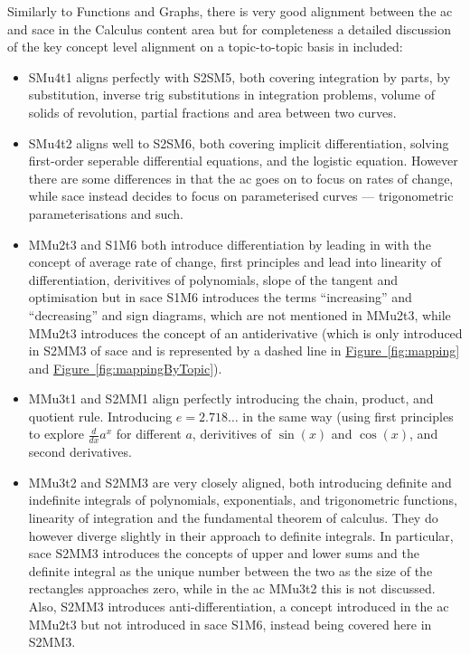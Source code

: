 \documentclass[twoside,12pt,a4paper]{report}
\newcommand{\reffig}[1]{\hyperref[fig:#1]{Figure~\ref{fig:#1}}}
\begin{document}
Similarly to Functions and Graphs, there is very good alignment between the \gls{ac} and \gls{sace} in the Calculus content area but for completeness a detailed discussion of the key concept level alignment on a topic-to-topic basis in included:

\begin{itemize}
	\item SMu4t1 aligns perfectly with S2SM5, both covering integration by parts, by substitution, inverse trig substitutions in integration problems, volume of solids of revolution, partial fractions and area between two curves. 
	\item SMu4t2 aligns well to S2SM6, both covering implicit differentiation, solving first-order seperable differential equations, and the logistic equation. However there are some differences in that the \gls{ac} goes on to focus on rates of change, while \gls{sace} instead decides to focus on parameterised curves --- trigonometric parameterisations and such.
	\item MMu2t3 and S1M6 both introduce differentiation by leading in with the concept of average rate of change, first principles and lead into linearity of differentiation, derivitives of polynomials, slope of the tangent and optimisation but in \gls{sace} S1M6 introduces the terms ``increasing'' and ``decreasing'' and sign diagrams, which are not mentioned in MMu2t3, while MMu2t3 introduces the concept of an antiderivative (which is only introduced in S2MM3 of \gls{sace} and is represented by a dashed line in \reffig{mapping} and \reffig{mappingByTopic}).  
	\item MMu3t1 and S2MM1 align perfectly introducing the chain, product, and quotient rule. Introducing $e = 2.718\hdots$ in the same way (using first principles to explore $\frac{d}{dx}{a^x}$ for different $a$, derivitives of $\sin(x)$ and $\cos(x)$, and second derivatives.  
	\item MMu3t2 and S2MM3 are very closely aligned, both introducing definite and indefinite integrals of polynomials, exponentials, and trigonometric functions, linearity of integration and the fundamental theorem of calculus. They do however diverge slightly in their approach to definite integrals. In particular, \gls{sace} S2MM3 introduces the concepts of upper and lower sums and the definite integral as the unique number between the two as the size of the rectangles approaches zero, while in the \gls{ac} MMu3t2 this is not discussed. Also, S2MM3 introduces anti-differentiation, a concept introduced in the \gls{ac} MMu2t3 but not introduced in \gls{sace} S1M6, instead being covered here in S2MM3.
\end{itemize}
	
\end{document}
